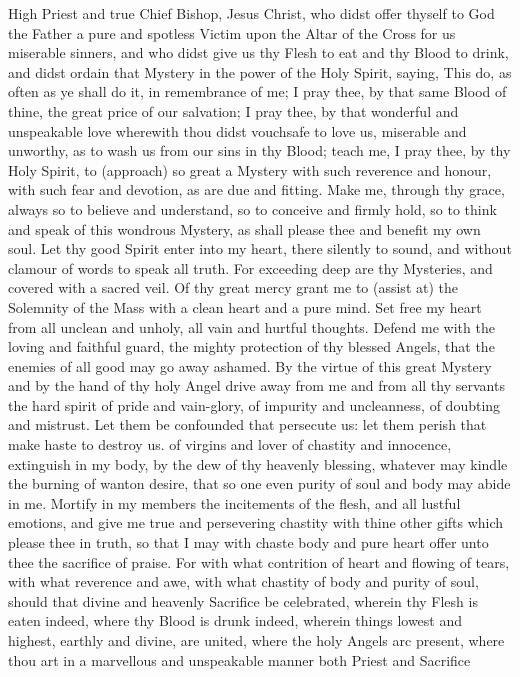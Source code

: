  High Priest and true Chief Bishop, Jesus Christ, who didst offer thyself to God the Father a pure and spotless Victim upon the Altar of the Cross for us miserable sinners, and who didst give us thy Flesh to eat and thy Blood to drink, and didst ordain that Mystery in the power of the Holy Spirit, saying, This do, as often as ye shall do it, in remembrance of me; I pray thee, by that same Blood of thine, the great price of our salvation; I pray thee, by that wonderful and unspeakable love wherewith thou didst vouchsafe to love us, miserable and unworthy, as to wash us from our sins in thy Blood; teach me, I pray thee, by thy Holy Spirit, to  (approach) so great a Mystery with such reverence and honour, with such fear and devotion, as are due and fitting. Make me, through thy grace, always so to believe and understand, so to conceive and firmly hold, so to think and speak of this wondrous Mystery, as shall please thee and benefit my own soul. Let thy good Spirit enter into my heart, there silently to sound, and without clamour of words to speak all truth. For exceeding deep are thy Mysteries, and covered with a sacred veil. Of thy great mercy grant me to (assist at) the Solemnity of the Mass with a clean heart and a pure mind. Set free my heart from all unclean and unholy, all vain and hurtful thoughts. Defend me with the loving and faithful guard, the mighty protection of thy blessed Angels, that the enemies of all good may go away ashamed. By the virtue of this great Mystery and by the hand of thy holy Angel drive away from me and from all thy servants the hard spirit of pride and vain-glory, of impurity and uncleanness, of doubting and mistrust. Let them be confounded that persecute us: let them perish that make haste to destroy us. 
 of virgins and lover of chastity and innocence, extinguish in my body, by the dew of thy heavenly blessing, whatever may kindle the burning of wanton desire, that so one even purity of soul and body may abide in me. Mortify in my members the incitements of the flesh, and all lustful emotions, and give me true and persevering chastity with thine other gifts which please thee in truth, so that I may with chaste body and pure heart offer unto thee the sacrifice of praise. For with what contrition of heart and flowing of tears, with what reverence and awe, with what chastity of body and purity of soul, should that divine and heavenly Sacrifice be celebrated, wherein thy Flesh is eaten indeed, where thy Blood is drunk indeed, wherein things lowest and highest, earthly and divine, are united, where the holy Angels arc present, where thou art in a marvellous and unspeakable manner both Priest and Sacrifice 
